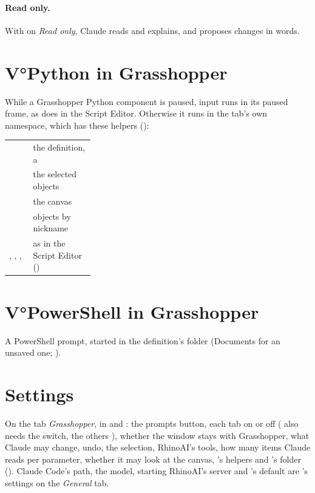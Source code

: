 \paragraph{Read only.} With  on \emph{Read only}, Claude reads and explains, and proposes
changes in words.

\section{V°Python in Grasshopper}

While a Grasshopper Python component is paused, input runs in its paused frame, as  does in the Script
Editor. Otherwise it runs in the tab's own namespace, which has these helpers
():

\begin{xltabular}{\linewidth}{@{}P{0.28\linewidth}L@{}}
\toprule
{}          & the definition, a  \\
     & the selected objects \\
       & the canvas \\
   & objects by nickname \\
, , ,  & as in the Script Editor () \\
\bottomrule
\end{xltabular}

\section{V°PowerShell in Grasshopper}

A PowerShell prompt, started in the definition's folder (Documents for an unsaved one;
).

\section{Settings}

On the tab \emph{Grasshopper}, in  and : the prompts
button, each tab on or off ( also needs the  switch, the others ), whether the window stays
with Grasshopper, what Claude may change, undo, the selection, RhinoAI's tools, how many items Claude reads per
parameter, whether it may look at the canvas, 's helpers and 's folder ().
Claude Code's path, the model, starting RhinoAI's server and 's default are 's settings on the
\emph{General} tab.
